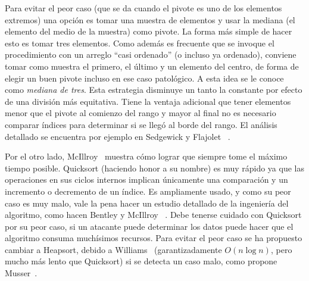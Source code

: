   Para evitar el peor caso
  (que se da cuando el pivote es uno de los elementos extremos)
  una opción es tomar una muestra de elementos y usar la mediana
  (el elemento del medio de la muestra)
  como pivote.
  La forma más simple de hacer esto es tomar tres elementos.
  Como además es frecuente que se invoque el procedimiento con un arreglo
  ``casi ordenado''
  (o incluso ya ordenado),
  conviene tomar como muestra el primero,
  el último
  y un elemento del centro,
  de forma de elegir un buen pivote incluso en ese caso patológico.
  A esta idea se le conoce como \emph{mediana de tres}.
  Esta estrategia disminuye un tanto la constante
  por efecto de una división más equitativa.
  Tiene la ventaja adicional
  que tener elementos menor que el pivote al comienzo del rango
  y mayor al final
  no es necesario comparar índices para determinar
  si se llegó al borde del rango.
  El análisis detallado se encuentra por ejemplo en Sedgewick y Flajolet~%
    \cite{sedgewick13:_introd_anal_algor}.

  Por el otro lado,
  McIllroy~\cite{mcillroy99:_killer_adver_quicksort}
  muestra cómo lograr que siempre tome el máximo tiempo posible.
  Quicksort
  (haciendo honor a su nombre)
  es muy rápido
  ya que las operaciones en sus ciclos internos
  implican únicamente una comparación
  y un incremento o decremento de un índice.
  Es ampliamente usado,
  y como su peor caso es muy malo,
  vale la pena hacer un estudio detallado de la ingeniería del algoritmo,
  como hacen Bentley y McIllroy~%
    \cite{bentley93:_engin_sort_funct}.
  Debe tenerse cuidado con Quicksort por su peor caso,
  si un atacante puede determinar los datos
  puede hacer que el algoritmo consuma muchísimos recursos.
  Para evitar el peor caso se ha propuesto cambiar a Heapsort,%
    debido a Williams~%
    \cite{williams64:_alg_heapsort}
  (garantizadamente \(O(n \log n)\),
   pero mucho más lento que Quicksort)
  si se detecta un caso malo,
  como propone Musser~\cite{musser97:_introsort}.


